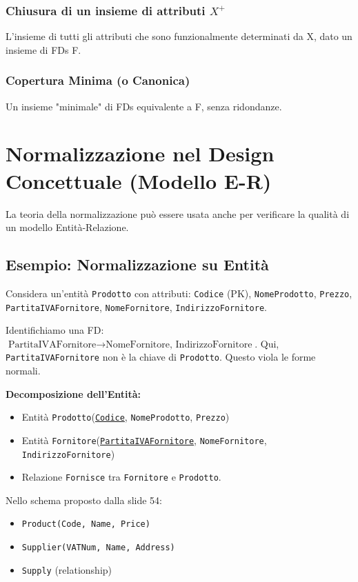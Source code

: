 \documentclass{article}
\begin{document}
	\subsubsection{Chiusura di un insieme di attributi $X^+$}
	L'insieme di tutti gli attributi che sono funzionalmente determinati da X, dato un insieme di FDs F.
	
	\subsubsection{Copertura Minima (o Canonica)}
	Un insieme "minimale" di FDs equivalente a F, senza ridondanze.
	
	\section{Normalizzazione nel Design Concettuale (Modello E-R)}
	La teoria della normalizzazione può essere usata anche per verificare la qualità di un modello Entità-Relazione.
	
	\subsection{Esempio: Normalizzazione su Entità}
	Considera un'entità \texttt{Prodotto} con attributi:
	\texttt{Codice} (PK), \texttt{NomeProdotto}, \texttt{Prezzo}, \texttt{PartitaIVAFornitore}, \texttt{NomeFornitore}, \texttt{IndirizzoFornitore}.
	
	Identifichiamo una FD: $\text{PartitaIVAFornitore} \rightarrow \text{NomeFornitore, IndirizzoFornitore}$.
	Qui, \texttt{PartitaIVAFornitore} non è la chiave di \texttt{Prodotto}.
	Questo viola le forme normali.
	
	\textbf{Decomposizione dell'Entità:}
	\begin{itemize}
		\item Entità \texttt{Prodotto}(\underline{\texttt{Codice}}, \texttt{NomeProdotto}, \texttt{Prezzo})
		\item Entità \texttt{Fornitore}(\underline{\texttt{PartitaIVAFornitore}}, \texttt{NomeFornitore}, \texttt{IndirizzoFornitore})
		\item Relazione \texttt{Fornisce} tra \texttt{Fornitore} e \texttt{Prodotto}.
	\end{itemize}
	Nello schema proposto dalla slide 54:
	\begin{itemize}
		\item \texttt{Product(Code, Name, Price)}
		\item \texttt{Supplier(VATNum, Name, Address)}
		\item \texttt{Supply} (relationship)
	\end{itemize}
	
\end{document}
